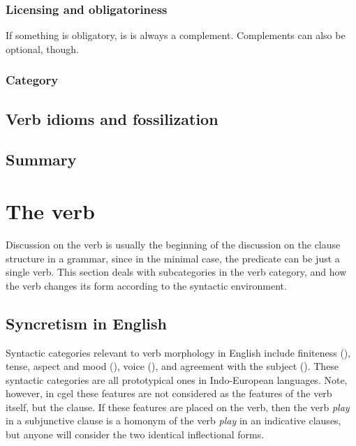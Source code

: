 \documentclass{article}
\newcommand*{\corpus}[1]{\emph{#1}}
\begin{document}
\subsubsection{Licensing and obligatoriness}

If something is obligatory, is is always a complement.
Complements can also be optional, though.


\subsubsection{Category}

\subsection{Verb idioms and fossilization}

\subsection{Summary}



\section{The verb}

Discussion on the verb is usually the beginning of the discussion on the clause structure in a grammar,
since in the minimal case, 
the predicate can be just a single verb.
This section deals with subcategories in the verb category,
and how the verb changes its form according to the syntactic environment.

\subsection{Syncretism in English}

Syntactic categories relevant to verb morphology in English include 
finiteness (),
tense, aspect and mood (),
voice (),
and agreement with the subject ().
These syntactic categories are all prototypical ones in Indo-European languages.
Note, however, in \ac{cgel} these features are not considered as the features of the verb itself,
but the clause. 
If these features are placed on the verb, 
then the verb \corpus{play} in a subjunctive clause is a homonym of 
the verb \corpus{play} in an indicative clauses,
but anyone will consider the two identical inflectional forms.
\end{document}
